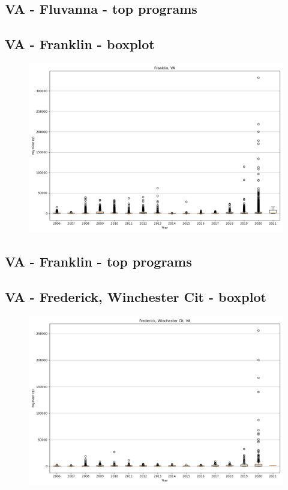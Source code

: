 \subsection*{VA - Fluvanna - top programs}

\newpage
\subsection*{VA - Franklin - boxplot}
\begin{figure}[h]
\centering
\includegraphics[width=7in]{../output/boxplots/counties/Franklin-VA_boxplot.png}
\end{figure}


\subsection*{VA - Franklin - top programs}

\newpage
\subsection*{VA - Frederick, Winchester Cit - boxplot}
\begin{figure}[h]
\centering
\includegraphics[width=7in]{../output/boxplots/counties/Frederick, Winchester Cit-VA_boxplot.png}
\end{figure}


